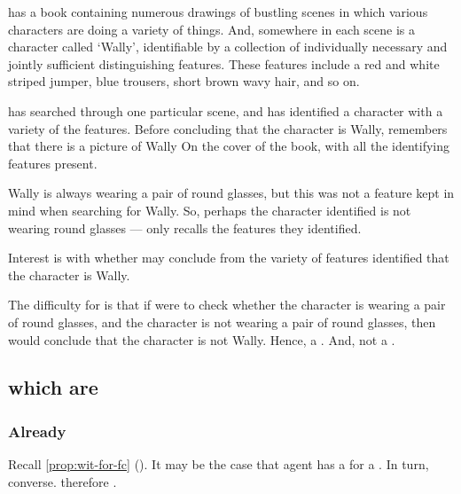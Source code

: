 \begin{note}[Wally]
  \begin{illustration}
    \label{illu:CS:wheres-wally}
     has a book containing numerous drawings of bustling scenes in which various characters are doing a variety of things.
    And, somewhere in each scene is a character called `Wally', identifiable by a collection of individually necessary and jointly sufficient distinguishing features.
    These features include a red and white striped jumper, blue trousers, short brown wavy hair, and so on.

     has searched through one particular scene, and has identified a character with a variety of the features.
    Before concluding that the character is Wally,  remembers that there is a picture of Wally On the cover of the book, with all the identifying features present.

    Wally is always wearing a pair of round glasses, but this was not a feature  kept in mind when searching for Wally.
    So, perhaps the character  identified is not wearing round glasses  ---  only recalls the features they identified.
  \end{illustration}

  Interest is with whether  may conclude from the variety of features identified that the character is Wally.

  The difficulty for  is that if  were to check whether the character is wearing a pair of round glasses, and the character is not wearing a pair of round glasses, then  would conclude that the character is not Wally.
  Hence, a \requ{}.
  And, not a \fc{}.
\end{note}

\subsection{ which are }
\label{cha:zS:sec:question:illu:basic:has}

\subsubsection{Already}

\begin{note}
  Recall \autoref{prop:wit-for-fc} ().
  It may be the case that agent has a \wit{} for a \fc{}.
  In turn, converse.
  \wit{} therefore \fc{}.
\end{note}

